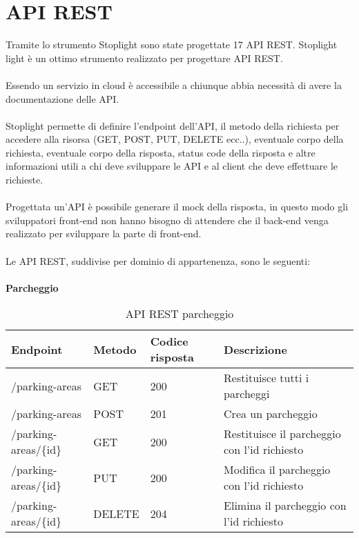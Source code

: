 \section{API REST}
Tramite lo strumento Stoplight sono state progettate 17 \gls{API} \gls{REST}. Stoplight light è un ottimo strumento realizzato
per progettare \gls{API} \gls{REST}.
\\\\
Essendo un servizio in cloud è accessibile a chiunque abbia necessità di avere la documentazione delle \gls{API}.
\\\\
Stoplight permette di definire l'\gls{endpoint} dell'\gls{API}, il metodo della richiesta per accedere alla risorsa (GET, POST, PUT, DELETE ecc..),
eventuale corpo della richiesta, eventuale corpo della risposta, status code della risposta e altre informazioni
utili a chi deve sviluppare le \gls{API} e al client che deve effettuare le richieste.
\\\\
Progettata un'\gls{API} è possibile generare il \gls{mock} della risposta, in questo modo gli sviluppatori \gls{front-end} non hanno bisogno
di attendere che il \gls{back-end} venga realizzato per sviluppare la parte di \gls{front-end}.
\\\\
Le \gls{API} \gls{REST}, suddivise per dominio di appartenenza, sono le seguenti:
\\\\
\textbf{Parcheggio}
\\
\begin{table}[H]
    \begin{tabular}{|p{3.2cm}|p{1.4cm}|p{1.4cm}|p{5.8cm}|} 
    \hline
    \textbf{Endpoint} & \textbf{Metodo} & \textbf{Codice risposta} & \textbf{Descrizione} \\ 
    \hline
    /parking-areas & GET & 200 & Restituisce tutti i parcheggi \\ 
    \hline
    /parking-areas & POST & 201 & Crea un parcheggio \\ 
    \hline
    /parking-areas/\{id\} & GET & 200 & Restituisce il parcheggio con l'id richiesto \\ 
    \hline
    /parking-areas/\{id\} & PUT & 200 & Modifica il parcheggio con l'id richiesto \\ 
    \hline
    /parking-areas/\{id\} & DELETE & 204 & Elimina il parcheggio con l'id richiesto \\ 
    \hline
    \end{tabular}
    \caption{API REST parcheggio}
\end{table}

